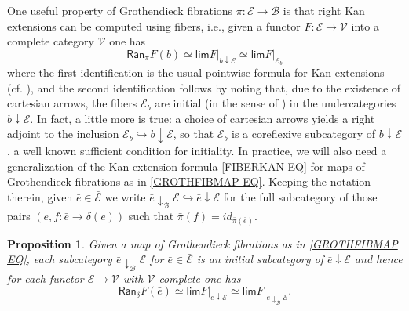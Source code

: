 \documentclass[a4paper,10pt
,draft
]{article}%
\numberwithin{equation}{section}
\numberwithin{figure}{section}
\newtheorem{proposition}[equation]{Proposition}%
\theoremstyle{definition} %
\newcommand{\1}{\ensuremath{\mathbbm 1}}%
\begin{document}
One useful property of Grothendieck fibrations
$\pi \colon \mathcal{E} \to \mathcal{B}$
is that right Kan extensions can be computed using fibers, i.e., 
given a functor $F \colon \mathcal{E} \to \mathcal{V}$ into a complete category $\mathcal{V}$ one has
\begin{equation}\label{FIBERKAN EQ}
	\mathsf{Ran}_{\pi}F (b)
\simeq
	\mathsf{lim} F{|_{b \downarrow \mathcal{E}}}
\simeq
	\mathsf{lim} F|_{\mathcal{E}_b}
\end{equation}
where the first identification is the usual pointwise formula for Kan extensions (cf. \cite[X.3 Thm. 1]{McL}),
and the second identification follows by noting that,
due to the existence of cartesian arrows,
the fibers $\mathcal{E}_b$ are initial (in the sense of \cite[IX.3]{McL})
in the undercategories $b \downarrow \mathcal{E}$.
In fact, a little more is true: a choice of cartesian arrows 
yields a right adjoint to the inclusion
$\mathcal{E}_b \hookrightarrow b \downarrow \mathcal{E}$, so that $\mathcal{E}_b$ is a coreflexive subcategory of 
$b \downarrow \mathcal{E}$,
a well known sufficient condition for initiality.
In practice, we will also need a generalization of the Kan extension formula \eqref{FIBERKAN EQ} for maps of Grothendieck fibrations as in \eqref{GROTHFIBMAP EQ}.
Keeping the notation therein, 
given $\bar{e} \in \bar{\mathcal{E}}$ we write 
$\bar{e} \downarrow_{\mathcal{B}} \mathcal{E} \hookrightarrow
\bar{e} \downarrow \mathcal{E}$
for the full subcategory of those pairs 
$\left(e,f \colon \bar{e} \to \delta(e)\right)$
such that $\bar{\pi}(f) = id_{\bar{\pi}(\bar{e})}$.


\begin{proposition}\label{FIBERKANMAP PROP}
	Given a map of Grothendieck fibrations
	as in \eqref{GROTHFIBMAP EQ},
	each subcategory $\bar{e} \downarrow_{\mathcal{B}} \mathcal{E}$
	for $\bar{e} \in \bar{\mathcal{E}}$
	is an initial subcategory of $\bar{e} \downarrow \mathcal{E}$
	and hence for each functor 
	$\mathcal{E} \to \mathcal{V}$
	with $\mathcal{V}$ complete one has
\begin{equation}\label{FIBERKANMAP EQ}
	\mathsf{Ran}_{\delta}F (\bar{e})
\simeq
	\mathsf{lim} F{|_{\bar{e} \downarrow \mathcal{E}}}
\simeq
	\mathsf{lim} F|_{\bar{e} \downarrow_{\mathcal{B}} \mathcal{E}}.
\end{equation}	
\end{proposition}
\end{document}
